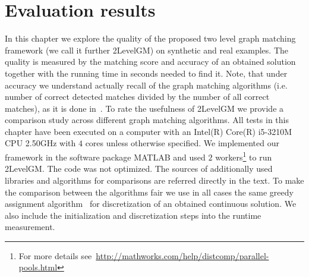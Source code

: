 \chapter{Evaluation results} \label{chapter:results}

In this chapter we explore the quality of the proposed two level graph matching framework (we call it further 2LevelGM) on synthetic and real examples. The quality is measured by the matching score and accuracy of an obtained solution together with the running time in seconds needed to find it. Note, that under accuracy we understand actually recall of the graph matching algorithms (i.e. number of correct detected matches divided by the number of all correct matches), as it is done in~\cite{Cho2014_Haystack,Cho2010_RRWM,Cho2012_ProgressiveGM,Duchenne2011,Rangarajan1996_GAGM,Leordeanu2005_SM,Leordeanu2009_IPFP}.
To rate the usefulness of 2LevelGM we provide a comparison study across different graph matching algorithms. All tests in this chapter have been executed on a computer with an Intel(R) Core(R) i5-3210M CPU 2.50GHz with $4$ cores unless otherwise specified. We implemented our framework in the software package MATLAB and used $2$ workers\footnote{For more details see~\url{http://mathworks.com/help/distcomp/parallel-pools.html}} to run 2LevelGM. The code was not optimized. The sources of additionally used libraries and algorithms for comparisons are referred directly in the text. To make the comparison between the algorithms fair we use in all cases the same greedy assignment algorithm~\cite{Leordeanu2005_SM} for discretization of an obtained continuous solution. We also include the initialization and discretization steps into the runtime measurement.

